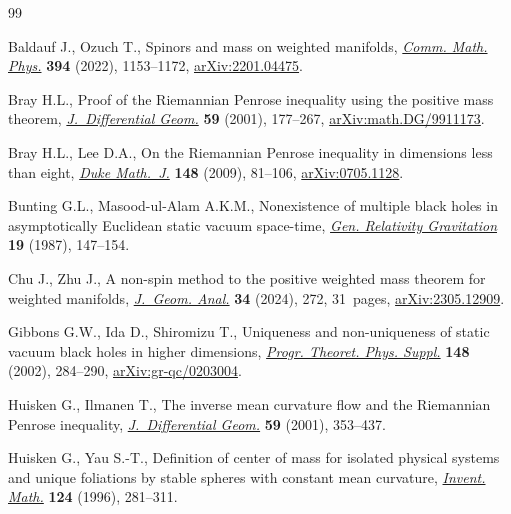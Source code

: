 \begin{thebibliography}{99}
\footnotesize\itemsep=0pt

Baldauf J., Ozuch T., Spinors and mass on weighted manifolds,
 \href{https://doi.org/10.1007/s00220-022-04420-y}{\textit{Comm. Math. Phys.}}
 \textbf{394} (2022), 1153--1172,
 \href{http://arxiv.org/abs/2201.04475}{arXiv:2201.04475}.

Bray H.L., Proof of the {R}iemannian {P}enrose inequality using the positive
 mass theorem,
 \href{https://doi.org/10.4310/jdg/1090349428}{\textit{J.~Differential Geom.}}
 \textbf{59} (2001), 177--267,
 \href{http://arxiv.org/abs/math.DG/9911173}{arXiv:math.DG/9911173}.

Bray H.L., Lee D.A., On the {R}iemannian {P}enrose inequality in dimensions
 less than eight,
 \href{https://doi.org/10.1215/00127094-2009-020}{\textit{Duke Math.~J.}}
 \textbf{148} (2009), 81--106,
 \href{http://arxiv.org/abs/0705.1128}{arXiv:0705.1128}.

Bunting G.L., Masood-ul-Alam A.K.M., Nonexistence of multiple black holes in
 asymptotically {E}uclidean static vacuum space-time,
 \href{https://doi.org/10.1007/BF00770326}{\textit{Gen. Relativity
 Gravitation}} \textbf{19} (1987), 147--154.

Chu J., Zhu J., A non-spin method to the positive weighted mass theorem for
 weighted manifolds,
 \href{https://doi.org/10.1007/s12220-024-01725-3}{\textit{J.~Geom. Anal.}}
 \textbf{34} (2024), 272, 31~pages,
 \href{http://arxiv.org/abs/2305.12909}{arXiv:2305.12909}.

Gibbons G.W., Ida D., Shiromizu T., Uniqueness and non-uniqueness of static
 vacuum black holes in higher dimensions, \href{https://doi.org/10.1143/PTPS.148.284}{\textit{Progr. Theoret. Phys. Suppl.}} \textbf{148} (2002), 284--290,
 \href{http://arxiv.org/abs/gr-qc/0203004}{arXiv:gr-qc/0203004}.

Huisken G., Ilmanen T., The inverse mean curvature flow and the {R}iemannian
 {P}enrose inequality,
 \href{https://doi.org/10.4310/jdg/1090349447}{\textit{J.~Differential Geom.}}
 \textbf{59} (2001), 353--437.

Huisken G., Yau S.-T., Definition of center of mass for isolated physical
 systems and unique foliations by stable spheres with constant mean curvature,
 \href{https://doi.org/10.1007/s002220050054}{\textit{Invent. Math.}}
 \textbf{124} (1996), 281--311.


\end{thebibliography}
